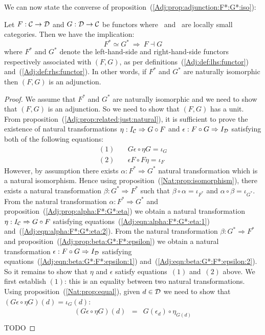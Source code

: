 \noindent
We can now state the converse of proposition~(\ref{Adj:prop:adjunction:F*:G*:iso}):
\begin{prop}\label{Adj:prop:F*:G*:iso:adjunction}
    Let $F:\mbox{$\cal C$}\to\mbox{$\cal D$}$ and $G:\mbox{$\cal D$}\to\mbox{$\cal C$}$ be functors where \Cat\ and \Dat\ 
    are locally small categories. Then we have the implication:
        \[
            F^{*}\simeq G^{*}\ \Rightarrow\ F\dashv G
        \]
    where $F^{*}$ and $G^{*}$ denote the left-hand-side and right-hand-side 
    functors respectively associated with $(F,G)$, as per 
    definitions~(\ref{Adj:def:lhs:functor}) and~(\ref{Adj:def:rhs:functor}). 
    In other words, if $F^{*}$ and $G^{*}$ are 
    naturally isomorphic then $(F,G)$ is an adjunction.
\end{prop}
\begin{proof}
    We assume that $F^{*}$ and $G^{*}$ are naturally isomorphic and we need
    to show that $(F,G)$ is an adjunction. So we need to show that $(F,G)$ has
    a unit. From proposition~(\ref{Adj:prop:related:just:natural}), it is
    sufficient to prove the existence of natural transformations
    $\eta:I_{\cal C}\Rightarrow G\circ F$ and 
    $\epsilon:F\circ G\Rightarrow I_{\cal D}$ satisfying both of the 
    following equations:
        \begin{eqnarray*}
            (1)&\ &G\epsilon\circ\eta G=\iota_{G}\\
            (2)&\ &\epsilon F \circ F\eta=\iota_{F}
        \end{eqnarray*}
    However, by assumption there exists $\alpha:F^{*}\Rightarrow G^{*}$ 
    natural transformation which is a natural isomorphism. Hence using
    proposition~(\ref{Nat:prop:isomorphism}), there exists a natural
    transformation $\beta:G^{*}\Rightarrow F^{*}$ such that
    $\beta\circ\alpha=\iota_{F^{*}}$ and $\alpha\circ\beta=\iota_{G^{*}}$.
    From the natural transformation $\alpha:F^{*}\Rightarrow G^{*}$ and
    proposition~(\ref{Adj:prop:alpha:F*:G*:eta}) we obtain a natural 
    transformation $\eta:I_{\cal C}\Rightarrow G\circ F$ satisfying 
    equations~(\ref{Adj:eqn:alpha:F*:G*:eta:1}) 
    and~(\ref{Adj:eqn:alpha:F*:G*:eta:2}). From the natural
    transformation $\beta:G^{*}\Rightarrow F^{*}$ and 
    proposition~(\ref{Adj:prop:beta:G*:F*:epsilon}) we obtain a natural
    transformation $\epsilon:F\circ G\Rightarrow I_{\cal D}$ satisfying
    equations~(\ref{Adj:eqn:beta:G*:F*:epsilon:1})
    and~(\ref{Adj:eqn:beta:G*:F*:epsilon:2}). So it remains to show that
    $\eta$ and $\epsilon$ satisfy equations~$(1)$ and~$(2)$ above. We first
    establish $(1)$: this is an equality between two natural transformations.
    Using proposition~(\ref{Nat:prop:equal}), given $d\in\mbox{$\cal D$}$ we need to show
    that $(G\epsilon \circ\eta G)(d) = \iota_{G}(d)$:
        \begin{eqnarray*}(G\epsilon \circ\eta G)(d)
            &=&G(\epsilon_{d})\circ\eta_{G(d)}\\
        \end{eqnarray*}
    TODO
\end{proof}

